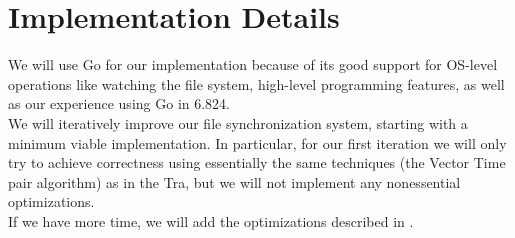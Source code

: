 \section{Implementation Details}
We will use Go for our implementation because of its good support for OS-level operations like watching the file system, high-level programming features, as well as our experience using Go in 6.824.\\

\noindent We will iteratively improve our file synchronization system, starting with a minimum viable implementation.  In particular, for our first iteration we will only try to achieve correctness using essentially the same techniques (the Vector Time pair algorithm) as in the Tra, but we will not implement any nonessential optimizations.\\

\noindent If we have more time, we will add the optimizations described in \cite{tra-tech-report}.

